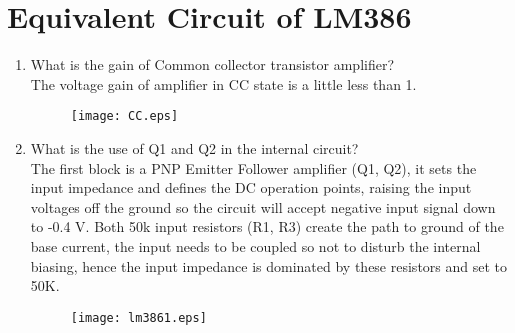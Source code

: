 \documentclass[journal,12pt,twocolumn]{IEEEtran}
\renewcommand\thesection{\arabic{section}}
\begin{document}
\section{Equivalent Circuit of LM386}
\begin{enumerate}[label=\thesection.\arabic*,ref=\thesection.\theenumi]
\begin{figure}[!ht]
\centering
\texttt{[image: LM386int.eps]}
\caption{}
\label{fig:1}
\end{figure}
\section{ Common Collector(Emitter Follower) Buffer}


\item What is the gain of Common collector transistor amplifier?\\
\solution 
The voltage gain of amplifier in CC state is a little less than 1.
\begin{figure}[!ht]
\centering
\texttt{[image: CC.eps]}
\caption{}
\label{fig:1}
\end{figure}

\item What is the use of Q1 and Q2 in the internal circuit?\\
\solution
The first block is a PNP Emitter Follower amplifier (Q1, Q2), it sets the input impedance and defines the DC operation points, raising the input voltages off the ground so the circuit will accept negative input signal down to -0.4 V. Both 50k input resistors (R1, R3) create the path to ground of the base current, the input needs to be coupled so not to disturb the internal biasing, hence the input impedance is dominated by these resistors and set to 50K.
\begin{figure}[!ht]
\centering
\texttt{[image: lm3861.eps]}
\caption{}
\label{fig:1}
\end{figure}
\end{enumerate}
\end{document}
